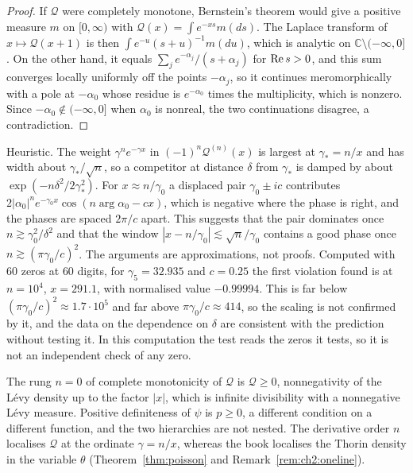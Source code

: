 \begin{proof}
If $\mathcal Q$ were completely monotone, Bernstein's theorem would give a positive measure $m$ on $[0,\infty)$ with $\mathcal Q(x)=\int e^{-xs}m(ds)$. The Laplace transform of $x\mapsto\mathcal Q(x+1)$ is then $\int e^{-u}(s+u)^{-1}m(du)$, which is analytic on $\mathbb C\setminus(-\infty,0]$. On the other hand, it equals $\sum_je^{-\alpha_j}/(s+\alpha_j)$ for $\operatorname{Re} s>0$, and this sum converges locally uniformly off the points $-\alpha_j$, so it continues meromorphically with a pole at $-\alpha_0$ whose residue is $e^{-\alpha_0}$ times the multiplicity, which is nonzero. Since $-\alpha_0\notin(-\infty,0]$ when $\alpha_0$ is nonreal, the two continuations disagree, a contradiction.
\end{proof}

\begin{remark}\label{xi:rem:scaling}
Heuristic. The weight $\gamma^ne^{-\gamma x}$ in $(-1)^n\mathcal Q^{(n)}(x)$ is largest at $\gamma_*=n/x$ and has width about $\gamma_*/\sqrt n$, so a competitor at distance $\delta$ from $\gamma_*$ is damped by about $\exp(-n\delta^2/2\gamma_*^2)$. For $x\approx n/\gamma_0$ a displaced pair $\gamma_0\pm ic$ contributes $2|\alpha_0|^ne^{-\gamma_0x}\cos(n\arg\alpha_0-cx)$, which is negative where the phase is right, and the phases are spaced $2\pi/c$ apart. This suggests that the pair dominates once $n\gtrsim\gamma_0^2/\delta^2$ and that the window $|x-n/\gamma_0|\lesssim\sqrt n/\gamma_0$ contains a good phase once $n\gtrsim(\pi\gamma_0/c)^2$. The arguments are approximations, not proofs. Computed with $60$ zeros at $60$ digits, for $\gamma_5=32.935$ and $c=0.25$ the first violation found is at $n=10^4$, $x=291.1$, with normalised value $-0.99994$. This is far below $(\pi\gamma_0/c)^2\approx1.7\cdot10^5$ and far above $\pi\gamma_0/c\approx414$, so the scaling is not confirmed by it, and the data on the dependence on $\delta$ are consistent with the prediction without testing it. In this computation the test reads the zeros it tests, so it is not an independent check of any zero.
\end{remark}

\begin{remark}\label{xi:rem:rungs}
The rung $n=0$ of complete monotonicity of $\mathcal Q$ is $\mathcal Q\ge0$, nonnegativity of the L\'evy density up to the factor $|x|$, which is infinite divisibility with a nonnegative L\'evy measure. Positive definiteness of $\psi$ is $p\ge0$, a different condition on a different function, and the two hierarchies are not nested. The derivative order $n$ localises $\mathcal Q$ at the ordinate $\gamma=n/x$, whereas the book localises the Thorin density in the variable $\theta$ (Theorem~\ref{thm:poisson} and Remark~\ref{rem:ch2:oneline}).
\end{remark}

